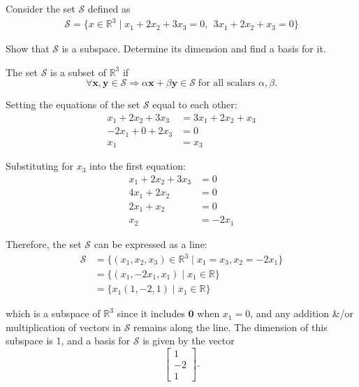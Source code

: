 \begin{homeworkProblem}


    Consider the set $\mathcal S$ defined as
    \[
        \begin{split}
            \mathcal S=\{x\in\mathbb R^3 \;|\; x_1+2x_2+3x_3=0, \ \  3x_1+2x_2+x_3=0\}
        \end{split}
    \]

    Show that $\mathcal S$ is a subspace. Determine its dimension and find a basis for it.
    \\

    \begin{solution}
        The set $\mathcal{S}$ is a subset of $\mathbb{R}^3$ if
        $$\forall \boldsymbol{x}, \boldsymbol{y} \in \mathcal{S} \Rightarrow \alpha 
        \boldsymbol{x} + \beta \boldsymbol{y} \in \mathcal{S} \; \text{for all scalars }
        \alpha, \beta \text{.}$$

        Setting the equations of the set $\mathcal{S}$ equal to each other:
        \[
            \begin{aligned}
                x_1 + 2x_2 + 3x_3 &= 3x_1 + 2x_2 + x_3 \\
                -2x_1 + 0 + 2x_3 &= 0 \\
                x_1 &= x_3
            \end{aligned}
        \]

        Substituting for \(x_3\) into the first equation:
        \[
            \begin{aligned}
                x_1 + 2x_2 + 3x_3 &= 0 \\
                4x_1 + 2x_2 &= 0 \\
                2x_1 + x_2 &= 0 \\
                x_2 &= -2x_1
            \end{aligned}
        \]

        Therefore, the set $\mathcal{S}$ can be expressed as a line:
        \[
            \begin{aligned}
                \mathcal{S} &= \{(x_1, x_2, x_3) \in \mathbb{R}^3 \mid x_1 = x_3, x_2 = -2x_1\} \\
                &= \{(x_1, -2x_1, x_1) \mid x_1 \in \mathbb{R}\} \\
                &= \{x_1(1, -2, 1) \mid x_1 \in \mathbb{R}\}
            \end{aligned}
        \]

        which is a subspace of $\mathbb{R}^3$ since it includes $\boldsymbol{0}$
        when $x_1 = 0$, and any addition \&/or multiplication of vectors in $\mathcal{S}$
        remains along the line. The dimension of this subspace is 1, 
        and a basis for $\mathcal{S}$ is given by the vector 
        \[
            \begin{bmatrix}
                1 \\
                -2 \\
                1
            \end{bmatrix}
            \text{.}
        \] 

    \end{solution}

\end{homeworkProblem}